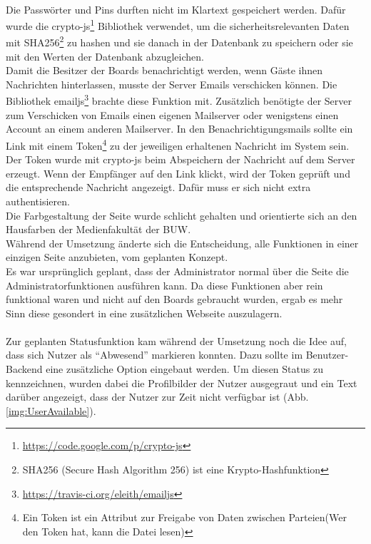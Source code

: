 \\
Die Passwörter und Pins durften nicht im Klartext gespeichert werden.
Dafür wurde die crypto-js\footnote{\url{https://code.google.com/p/crypto-js}} Bibliothek verwendet, um die sicherheitsrelevanten Daten mit SHA256\footnote{SHA256 (Secure Hash Algorithm 256) ist eine Krypto-Hashfunktion} zu hashen und sie danach in der Datenbank zu speichern oder sie mit den Werten der Datenbank abzugleichen.
\\
Damit die Besitzer der Boards benachrichtigt werden, wenn Gäste ihnen Nachrichten hinterlassen, musste der Server Emails verschicken können.
Die Bibliothek emailjs\footnote{\url{https://travis-ci.org/eleith/emailjs}} brachte diese Funktion mit. Zusätzlich benötigte der Server zum Verschicken von Emails einen eigenen Mailserver oder wenigstens einen Account an einem anderen Mailserver.
In den Benachrichtigungsmails sollte ein Link mit einem Token\footnote{Ein Token ist ein Attribut zur Freigabe von Daten zwischen Parteien(Wer den Token hat, kann die Datei lesen)} zu der jeweiligen erhaltenen Nachricht im System sein. Der Token wurde mit crypto-js beim Abspeichern der Nachricht auf dem Server erzeugt. Wenn der Empfänger auf den Link klickt, wird der Token geprüft und die entsprechende Nachricht angezeigt. Dafür muss er sich nicht extra authentisieren.
\\
Die Farbgestaltung der Seite wurde schlicht gehalten und orientierte sich an den Hausfarben der Medienfakultät der BUW.
\\
Während der Umsetzung änderte sich die Entscheidung, alle Funktionen in einer einzigen Seite anzubieten, vom geplanten Konzept.
\\
Es war ursprünglich geplant, dass der Administrator normal über die Seite die Administratorfunktionen ausführen kann. Da diese Funktionen aber rein funktional waren und nicht auf den Boards gebraucht wurden, ergab es mehr Sinn diese gesondert in eine zusätzlichen Webseite auszulagern.
\\
\\
Zur geplanten Statusfunktion kam während der Umsetzung noch die Idee auf, dass sich Nutzer als ``Abwesend'' markieren konnten. Dazu sollte im Benutzer-Backend eine zusätzliche Option eingebaut werden. Um diesen Status zu kennzeichnen, wurden dabei die Profilbilder der Nutzer ausgegraut und ein Text darüber angezeigt, dass der Nutzer zur Zeit nicht verfügbar ist (Abb. \ref{img:UserAvailable}).
